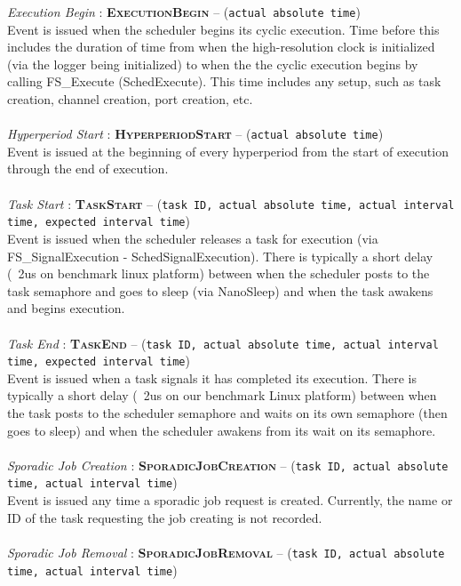 \noindent\textit{Execution Begin} : \textbf{\textsc{ExecutionBegin}} -- (\texttt{actual absolute time})\\
Event is issued when the scheduler begins its cyclic execution.  Time before this includes the duration of time from when the high-resolution clock is initialized (via the logger being initialized) to when the the cyclic execution begins by calling FS\_Execute (SchedExecute).  This time includes any setup, such as task creation, channel creation, port creation, etc.
\\
\\
\textit{Hyperperiod Start} : \textbf{\textsc{HyperperiodStart}} -- (\texttt{actual absolute time})\\
Event is issued at the beginning of every hyperperiod from the start of execution through the end of execution.
\\
\\
\textit{Task Start} : \textbf{\textsc{TaskStart}} -- (\texttt{task ID, actual absolute time, actual interval time, expected interval time})\\
Event is issued when the scheduler releases a task for execution (via FS\_SignalExecution - SchedSignalExecution).  There is typically a short delay (~2us on benchmark linux platform) between when the scheduler posts to the task semaphore and goes to sleep (via NanoSleep) and when the task awakens and begins execution.
\\
\\
\textit{Task End} : \textbf{\textsc{TaskEnd}} -- (\texttt{task ID, actual absolute time, actual interval time, expected interval time})\\
Event is issued when a task signals it has completed its execution.  There is typically a short delay (~2us on our benchmark Linux platform) between when the task posts to the scheduler semaphore and waits on its own semaphore (then goes to sleep) and when the scheduler awakens from its wait on its semaphore.
\\
\\
\textit{Sporadic Job Creation} : \textbf{\textsc{SporadicJobCreation}} -- (\texttt{task ID, actual absolute time, actual interval time})\\
Event is issued any time a sporadic job request is created.  Currently, the name or ID of the task requesting the job creating is not recorded.
\\
\\
\textit{Sporadic Job Removal} : \textbf{\textsc{SporadicJobRemoval}} -- (\texttt{task ID, actual absolute time, actual interval time})\\
